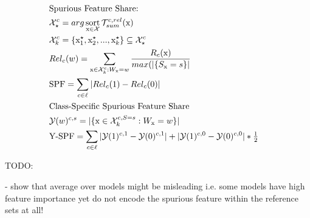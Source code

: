 \begin{align}\displaystyle
& \text{Spurious Feature Share: } \notag &  \\
& \mathcal{X}_{\star}^{c} = arg \operatorname*{sort}_{\mathrm{x} \in \mathcal{X}} \mathcal{T}_{sum}^{c,rel}(\mathrm{x}) & \\
& \mathcal{X}_{k}^{c} = \{ \mathrm{x}_{1}^{\star},\mathrm{x}_{2}^{\star},..., \mathrm{x}_{k}^{\star} \} \subseteq \mathcal{X}_{\star}^{c} & \\
& Rel_c(w) = \sum_{\mathrm{x} \in \mathcal{X}_{k}^{c}:  W_{\mathrm{x}} = w } \frac{ R_c(\mathrm{x})   }
{max(|\{S_{\mathrm{x}} = s \}|}    & \\
& \text{SPF} = \sum_{c \in \ell} | Rel_c(1) - Rel_c(0) |  & \\
& \text{Class-Specific Spurious Feature Share } \notag & \\
& \mathcal{Y}(w)^{c,s} = | \{ \mathrm{x} \in \mathcal{X}_{k}^{c, S=s}: W_{\mathrm{x}} = w  \} | & \\
& \text{Y-SPF} = \sum_{c \in \ell} | \mathcal{Y}(1)^{c,1} - \mathcal{Y}(0)^{c,1} | +| \mathcal{Y}(1)^{c,0} - \mathcal{Y}(0)^{c,0} | * \tfrac{1}{2} & \\
\end{align}

TODO:

- show that average over models might be misleading i.e. some models have high feature importance yet do not encode the spurious feature within the reference sets at all!

